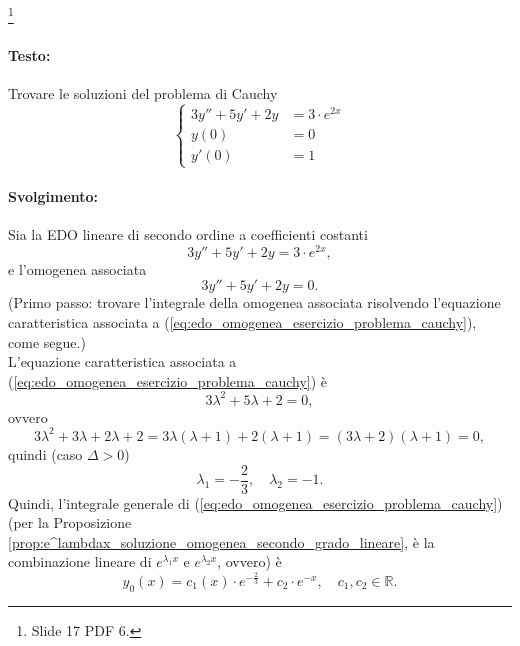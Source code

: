 \begin{example}\footnote{Slide 17 PDF 6.}
	\paragraph{Testo:} Trovare le soluzioni del problema di Cauchy
	\begin{equation*}
		\begin{cases}
			3 y'' + 5 y' + 2 y &= 3\cdot e^{2x}\\
			y(0) &= 0\\
			y'(0) &= 1
		\end{cases}
	\end{equation*}
	\paragraph{Svolgimento:} Sia la EDO lineare di secondo ordine a coefficienti costanti
	\begin{equation}\label{eq:edo_completa_esercizio_problema_cauchy}
		3 y'' + 5 y' + 2 y = 3\cdot e^{2x},
	\end{equation}
	e l'omogenea associata
	\begin{equation}\label{eq:edo_omogenea_esercizio_problema_cauchy}
		3 y'' + 5 y' + 2 y = 0.
	\end{equation}
	(Primo passo: trovare l'integrale della omogenea associata risolvendo l'equazione caratteristica associata a (\ref{eq:edo_omogenea_esercizio_problema_cauchy}), come segue.)\\
	L'equazione caratteristica associata a (\ref{eq:edo_omogenea_esercizio_problema_cauchy}) è
	\begin{equation*}
		3\lambda^2 + 5 \lambda + 2 = 0,
	\end{equation*}
	ovvero
	\begin{equation*}
		3\lambda ^2 + 3\lambda + 2\lambda + 2 = 3\lambda(\lambda +1) + 2(\lambda + 1)=(3 \lambda +2)(\lambda +1)=0,
	\end{equation*}
	quindi (caso $\Delta>0$)
	\begin{equation*}
		\lambda_1 = -\frac{2}{3},\quad \lambda_2 = -1.
	\end{equation*}
	Quindi, l'integrale generale di (\ref{eq:edo_omogenea_esercizio_problema_cauchy}) (per la Proposizione \ref{prop:e^lambdax_soluzione_omogenea_secondo_grado_lineare}, è la combinazione lineare di $e^{\lambda_1 x}$ e $e^{\lambda_2 x}$, ovvero) è
	\begin{equation*}
		y_0(x)=c_1(x)\cdot e^{-\frac{2}{3}} + c_2 \cdot e^{-x},\quad c_1,c_2\in\mathbb{R}.

\end{equation*}
\end{example}
